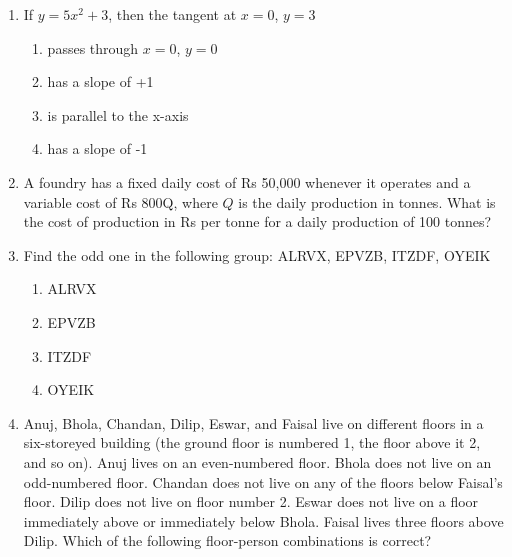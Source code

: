 \documentclass[journal,12pt,onecolumn]{IEEEtran}
\theoremstyle{remark}
\begin{document}
\begin{enumerate}
\item  If $y = 5x^2+ 3$, then the tangent at $x = 0$, $y = 3$

\begin{enumerate}
\item  passes through $x = 0$, $y = 0$
\item  has a slope of +1
\item  is parallel to the x-axis
\item  has a slope of -1
\end{enumerate}

\item 
A foundry has a fixed daily cost of Rs 50,000 whenever it operates and a variable cost of Rs 800Q, where $Q$ is the daily production in tonnes. What is the cost of production in Rs per tonne for a daily production of 100 tonnes?

\item Find the odd one in the following group: ALRVX, EPVZB, ITZDF, OYEIK

\begin{enumerate}
    \item ALRVX
    \item EPVZB
    \item ITZDF
    \item OYEIK
\end{enumerate}


\item Anuj, Bhola, Chandan, Dilip, Eswar, and Faisal live on different floors in a six-storeyed building (the ground floor is numbered 1, the floor above it 2, and so on). Anuj lives on an even-numbered floor. Bhola does not live on an odd-numbered floor. Chandan does not live on any of the floors below Faisal's floor. Dilip does not live on floor number 2. Eswar does not live on a floor immediately above or immediately below Bhola. Faisal lives three floors above Dilip. Which of the following floor-person combinations is correct?








\end{enumerate}
\end{document}
